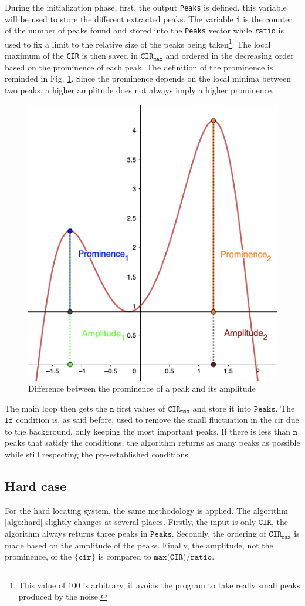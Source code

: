 During the initialization phase, first, the output \texttt{Peaks} is defined, this variable will be used to store the different extracted peaks. The variable \texttt{i} is the counter of the number of peaks found and stored into the \texttt{Peaks} vector while \texttt{ratio} is used to fix a limit to the relative size of the peaks being taken\footnote{This value of 100 is arbitrary, it avoids the program to take really small peaks produced by the noise.}. The local maximum of the \texttt{CIR} is then saved in $\texttt{CIR}_\texttt{max}$ and ordered in the decreasing order based on the prominence of each peak. The definition of the prominence is reminded in Fig. \ref{fig:prominence}. Since the prominence depends on the local minima between two peaks, a higher amplitude does not always imply a higher prominence.

\begin{figure}[H]
\centering
\includegraphics[width=.35\linewidth]{Images/prominence.png}
\caption{Difference between the prominence of a peak and its amplitude \label{fig:prominence}}
\end{figure}

The main loop then gets the $\texttt{n}$ first values of $\texttt{CIR}_\texttt{max}$ and store it into $\texttt{Peaks}$. The $\texttt{If}$ condition is, as said before, used to remove the small fluctuation in the \gls{cir} due to the background, only keeping the most important peaks. If there is less than $\texttt{n}$ peaks that satisfy the conditions, the algorithm returns as many peaks as possible while still respecting the pre-established conditions.

\subsection{Hard case}

For the hard locating system, the same methodology is applied. The algorithm \ref{algo:hard} slightly changes at several places. Firstly, the input is only $\texttt{CIR}$, the algorithm always returns three peaks in $\texttt{Peaks}$. Secondly, the ordering of $\texttt{CIR}_\texttt{max}$ is made based on the amplitude of the peaks. Finally, the amplitude, not the prominence, of the $\{\texttt{cir}\}$  is compared to $\texttt{max(CIR)}/\texttt{ratio}$.
\vspace{2mm}

